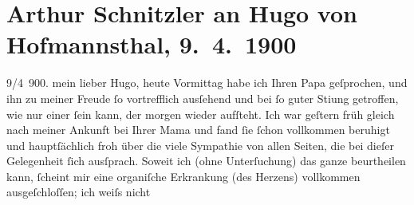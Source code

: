 

         
         \renewcommand{\erwaehntePersonen}{Personen: Richard Beer-Hofmann, Georg Hirschfeld, Hugo von Hofmannsthal, Hugo August von Hofmannsthal, Anna von Hofmannsthal, Elly Petersen, Marie Reinhard, Hans Schandlbauer}
         \renewcommand{\erwaehnteOrte}{Orte: Dalmatien, Dubrovnik, Opatija, Paris, Wien}
         \renewcommand{\erwaehnteWerke}{Werke: Ein Erfolg, Frau Bertha Garlan. Roman, Im Spiel der Sommerlüfte. In drei Aufzügen, Tagebuch}
               \section[Arthur Schnitzler an Hugo von Hofmannsthal, 9. 4. 1900]{ Arthur Schnitzler an Hugo von Hofmannsthal, 9. 4. 1900}\nopagebreak{}\rehead{ }\begin{ledgroupsized}[t]{13cm}\normalsize\beginnumbering \toendnotes[C]{\smallbreak\pagebreak[2]} 
\toendnotes[C]{\smallbreak}\pstart
           \raggedleft{}{\pb}9/4 900. \pend
           \pstart
           mein lieber Hugo, heute Vormittag habe ich Ihren Papa geſprochen, und ihn zu meiner Freude
               ſo vortrefflich ausſehend und bei ſo guter Sti{\geminationm}ung
               getroffen, wie nur einer ſein kann, der morgen wieder aufſteht. Ich war geſtern
                  früh gleich nach meiner Ankunft bei Ihrer Mama und fand ſie ſchon vollkommen beruhigt
               und hauptſächlich froh über die viele Sympathie von allen Seiten, die bei dieſer
               Gelegenheit ſich ausſprach. {\pb}Soweit ich (ohne
               Unterſuchung) das ganze beurtheilen kann, ſcheint mir eine organiſche Erkrankung \introOben{}(des Herzens)\introOben{} vollkommen ausgeſchloſſen; ich weiſs nicht

\end{ledgroupsized}
